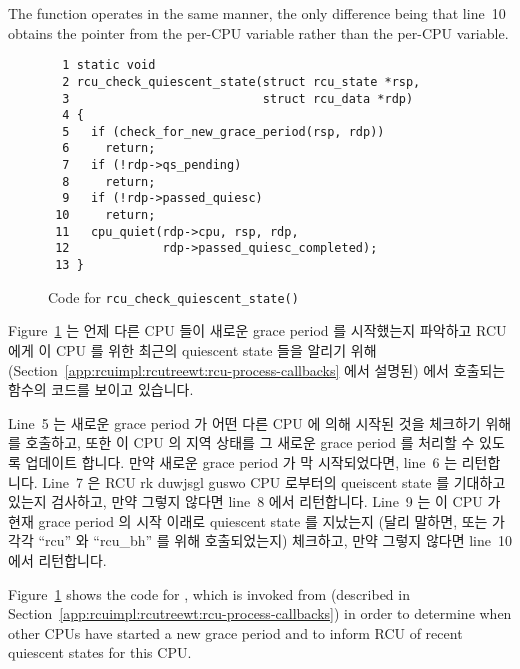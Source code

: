 The  function operates in the same manner,
the only difference being that line~10 obtains the 
pointer from the  per-CPU variable rather than
the  per-CPU variable.
\fi

\begin{figure}[tbp]
{ \scriptsize
\begin{verbatim}
  1 static void
  2 rcu_check_quiescent_state(struct rcu_state *rsp,
  3                           struct rcu_data *rdp)
  4 {
  5   if (check_for_new_grace_period(rsp, rdp))
  6     return;
  7   if (!rdp->qs_pending)
  8     return;
  9   if (!rdp->passed_quiesc)
 10     return;
 11   cpu_quiet(rdp->cpu, rsp, rdp,
 12             rdp->passed_quiesc_completed);
 13 }
\end{verbatim}
}
\caption{Code for {\tt rcu\_check\_quiescent\_state()}}
\label{fig:app:rcuimpl:rcutreewt:Code for rcu-check-quiescent-state}
\end{figure}

Figure~\ref{fig:app:rcuimpl:rcutreewt:Code for rcu-check-quiescent-state}
는 언제 다른 CPU 들이 새로운 grace period 를 시작했는지 파악하고 RCU 에게 이
CPU 를 위한 최근의 quiescent state 들을 알리기 위해
(Section~\ref{app:rcuimpl:rcutreewt:rcu-process-callbacks} 에서 설명된)
 에서 호출되는 
함수의 코드를 보이고 있습니다.

Line~5 는 새로운 grace period 가 어떤 다른 CPU 에 의해 시작된 것을 체크하기
위해  를 호출하고, 또한 이 CPU 의 지역 상태를
그 새로운 grace period 를 처리할 수 있도록 업데이트 합니다.
만약 새로운 grace period 가 막 시작되었다면, line~6 는 리턴합니다.
Line~7 은 RCU rk duwjsgl guswo CPU 로부터의 queiscent state 를 기대하고 있는지
검사하고, 만약 그렇지 않다면 line~8 에서 리턴합니다.
Line~9 는 이 CPU 가 현재 grace period 의 시작 이래로 quiescent state 를
지났는지 (달리 말하면,  또는  가
각각 ``rcu'' 와 ``rcu\_bh'' 를 위해 호출되었는지) 체크하고, 만약 그렇지 않다면
line~10 에서 리턴합니다.
\iffalse

Figure~\ref{fig:app:rcuimpl:rcutreewt:Code for rcu-check-quiescent-state}
shows the code for , which is invoked
from 
(described in Section~\ref{app:rcuimpl:rcutreewt:rcu-process-callbacks})
in order to determine when other CPUs have started a new grace period
and to inform RCU of recent quiescent states for this CPU.

